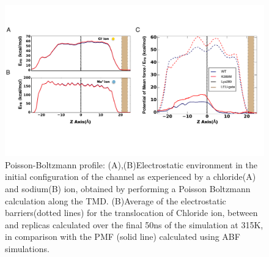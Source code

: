 \documentclass[9pt,onecolumn,oneside,lineno]{pnas-new}
\begin{document}
\begin{figure}
\begin{center}
\includegraphics[width = 1\textwidth]{figures_2/sup2_APBS}
\end{center}
\caption{Poisson-Boltzmann profile: (A),(B)Electrostatic environment in the initial configuration of the channel as experienced by a chloride(A) and sodium(B) ion, obtained by performing a Poisson Boltzmann calculation along the TMD. (B)Average of the electrostatic barriers(dotted lines) for the translocation of Chloride ion, between \WT and \MT replicas calculated over the final 50ns of the simulation at 315K, in comparison with the PMF (solid line) calculated using ABF simulations.}
\label{fig:APBS_2}
\end{figure}

\end{document}
